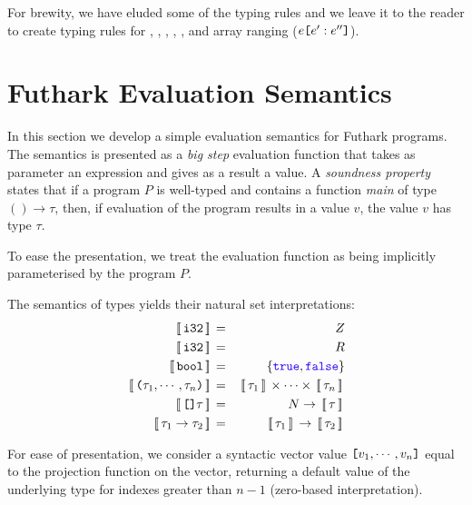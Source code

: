 \documentclass[oneside,11pt]{book}
\begin{document}
For brewity, we have eluded some of the typing rules and we leave it
to the reader to create typing rules for , ,
, , , and array ranging
($e\texttt{[}e':e''\texttt{]}$).



\section{Futhark Evaluation Semantics}

In this section we develop a simple evaluation semantics for Futhark
programs. The semantics is presented as a \emph{big step} evaluation
function that takes as parameter an expression and gives as a result a
value. A \emph{soundness property} states that if a program $P$ is
well-typed and contains a function \emph{main} of type $() \rightarrow
\tau$, then, if evaluation of the program results in a value $v$, the
value $v$ has type $\tau$.

To ease the presentation, we treat the evaluation function as being
implicitly parameterised by the program $P$. %

\newcommand{\Eval}[1]{\,\sem{\,#1\,}\,}
\newcommand{\extractF}[1]{\langle\,#1\,\rangle}
\newcommand{\Let}{\mathrm{let}}
\newcommand{\Where}[1]{\mathrm{where} \begin{array}[t]{l} #1 \end{array}}
\newcommand{\In}{\mathrm{in}}
\newcommand{\N}{N}
\newcommand{\Z}{Z}
\newcommand{\R}{R}
The semantics of types yields their natural set interpretations:
\begin{eqnarray*}
  \Eval{\kw{i32}} & = & \Z \\
  \Eval{\kw{i32}} & = & \R \\
  \Eval{\kw{bool}} & = & \{\fop{true},\fop{false}\} \\
  \Eval{\kw{(}\tau_1,\cdots,\tau_n\kw{)}} & = & \Eval{\tau_1} \times \cdots \times \Eval{\tau_n} \\
  \Eval{\kw{[]}\tau} & = & \N \rightarrow \Eval{\tau} \\
  \Eval{\tau_1 \rightarrow \tau_2} & = & \Eval{\tau_1} \rightarrow \Eval{\tau_2}
\end{eqnarray*}

For ease of presentation, we consider a syntactic vector value $\texttt{[}v_1,\cdots,v_n\texttt{]}$ equal to the projection function on the vector, returning a default value of the underlying type for indexes greater than $n-1$ (zero-based interpretation).
\end{document}
